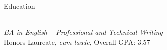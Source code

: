 \documentclass[11pt]{resume} %
\begin{document}

\begin{rSection}{\large Education}
	
	\textbf{\underline{}} \hfill {} \\ 
	\textit{BA in English – Professional and Technical Writing} \smallskip \\
\small	Honors Laureate, \textit{cum laude}, Overall GPA: 3.57
	
\end{rSection}

\end{document}
